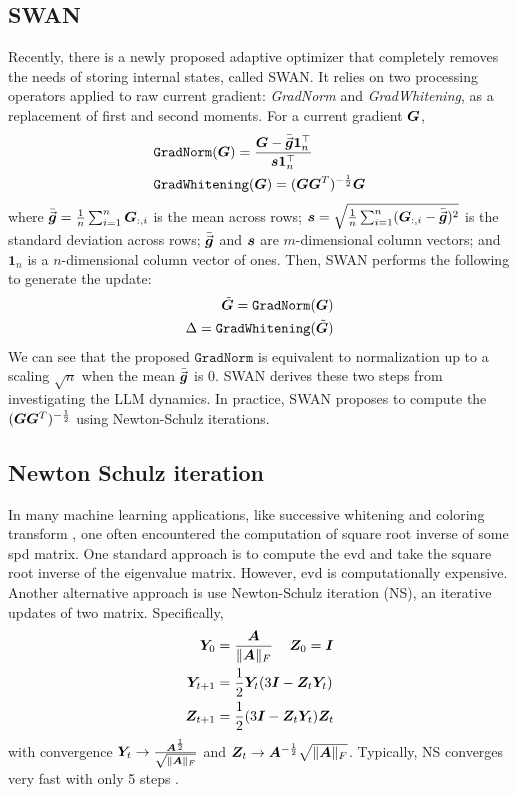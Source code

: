 \subsection{SWAN}
\label{subapp: SWAN optimizer}
Recently, there is a newly proposed adaptive optimizer that completely removes the needs of storing internal states, called SWAN. It relies on two processing operators applied to raw current gradient: \emph{GradNorm} and \emph{GradWhitening}, as a replacement of first and second moments. For a current gradient ${\bm{G}}$,
\begin{align}
    &\mathtt{GradNorm}({\bm{G}}) = \frac{ {\bm{G}} - \bar{\vec{\bm{g}}} \mathbf{1}_{n}^\top }{ {\bm{s}} \mathbf{1}_{n}^\top  } \\
    & \mathtt{GradWhitening}({\bm{G}}) = ({\bm{G}}{\bm{G}}^T)^{-\frac{1}{2}}{\bm{G}}
    \label{eq: gradnorm and whitening}
\end{align}
where $ \bar{\vec{\bm{g}}} = \frac{1}{n} \sum_{i=1}^{n} {\bm{G}}_{:, i} $ is the mean across rows; $ {\bm{s}} = \sqrt{ \frac{1}{n} \sum_{i=1}^{n} ({\bm{G}}_{:, i} - \bar{\vec{\bm{g}}})^2} $ is the standard deviation across rows; $\bar{\vec{\bm{g}}}$ and ${\bm{s}}$ are ${m}$-dimensional column vectors; and $ \mathbf{1}_{n} $ is a ${n}$-dimensional column vector of ones. 
Then, SWAN performs the following to generate the update:
\begin{align}
    \tilde{{\bm{G}}} = \mathtt{GradNorm}({\bm{G}})\nonumber\\
    \Delta = \mathtt{GradWhitening}(\tilde{{\bm{G}}})
    \label{eq: SWAN update}
\end{align}
We can see that the proposed $\mathtt{GradNorm}$ is equivalent to normalization up  to a scaling $\sqrt{n}$ when the mean $ \bar{\vec{\bm{g}}}$ is $0$.
SWAN derives these two steps from investigating the LLM dynamics. In practice, SWAN proposes to compute the $({\bm{G}}{\bm{G}}^T)^{-\frac{1}{2}}$ using Newton-Schulz iterations.

\subsection{Newton Schulz iteration}
\label{subapp: Newton schulz iteration}
In many machine learning applications, like successive whitening and coloring transform \citep{li2017universal,cho2019image,choi2021robustnet}, one often encountered the computation of square root inverse of some \gls{spd} matrix. One standard approach is to compute the \gls{evd} and take the square root inverse of the eigenvalue matrix. However, \gls{evd} is computationally expensive. Another alternative approach is use Newton-Schulz iteration (NS), an iterative updates of two matrix. Specifically, 
\begin{align*}
    {\bm{Y}}_0 &= \frac{{\bm{A}}}{\Vert{\bm{A}}\Vert_F}\;\;\;\ {\bm{Z}}_0={\bm{I}}\\
    {\bm{Y}}_{t+1} &= \frac{1}{2}{\bm{Y}}_t(3{\bm{I}}-{\bm{Z}}_t{\bm{Y}}_t)\\
    {\bm{Z}}_{t+1} &= \frac{1}{2}(3{\bm{I}}-{\bm{Z}}_t{\bm{Y}}_t){\bm{Z}}_t
\end{align*}
with convergence ${\bm{Y}}_t \rightarrow \frac{{\bm{A}}^{\frac{1}{2}}}{\sqrt{\Vert{\bm{A}}\Vert_F}}$ and ${\bm{Z}}_t\rightarrow {\bm{A}}^{-\frac{1}{2}}\sqrt{\Vert{\bm{A}}\Vert_F}$. Typically, NS converges very fast with only 5 steps \citep{li2018towards,huang2019iterative}. 

